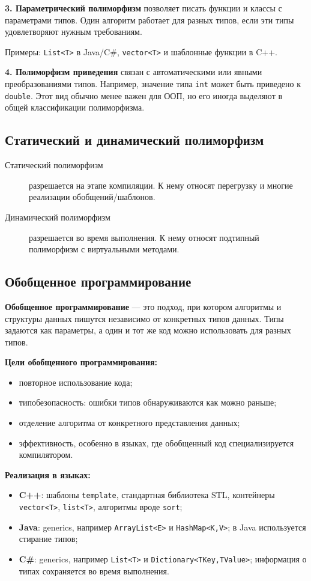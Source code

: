 \textbf{3. Параметрический полиморфизм} позволяет писать функции и классы с параметрами типов. Один алгоритм работает для разных типов, если эти типы удовлетворяют нужным требованиям.

Примеры: \texttt{List<T>} в Java/C\#, \texttt{vector<T>} и шаблонные функции в C++.

\textbf{4. Полиморфизм приведения} связан с автоматическими или явными преобразованиями типов. Например, значение типа \texttt{int} может быть приведено к \texttt{double}. Этот вид обычно менее важен для ООП, но его иногда выделяют в общей классификации полиморфизма.

\subsection*{Статический и динамический полиморфизм}

\begin{description}
    \item[Статический полиморфизм] разрешается на этапе компиляции. К нему относят перегрузку и многие реализации обобщений/шаблонов.
    \item[Динамический полиморфизм] разрешается во время выполнения. К нему относят подтипный полиморфизм с виртуальными методами.
\end{description}

\subsection*{Обобщенное программирование}

\textbf{Обобщенное программирование} --- это подход, при котором алгоритмы и структуры данных пишутся независимо от конкретных типов данных. Типы задаются как параметры, а один и тот же код можно использовать для разных типов.

\textbf{Цели обобщенного программирования:}
\begin{itemize}
    \item повторное использование кода;
    \item типобезопасность: ошибки типов обнаруживаются как можно раньше;
    \item отделение алгоритма от конкретного представления данных;
    \item эффективность, особенно в языках, где обобщенный код специализируется компилятором.
\end{itemize}

\textbf{Реализация в языках:}
\begin{itemize}
    \item \textbf{C++}: шаблоны \texttt{template}, стандартная библиотека STL, контейнеры \texttt{vector<T>}, \texttt{list<T>}, алгоритмы вроде \texttt{sort};
    \item \textbf{Java}: generics, например \texttt{ArrayList<E>} и \texttt{HashMap<K,V>}; в Java используется стирание типов;
    \item \textbf{C\#}: generics, например \texttt{List<T>} и \texttt{Dictionary<TKey,TValue>}; информация о типах сохраняется во время выполнения.
\end{itemize}


